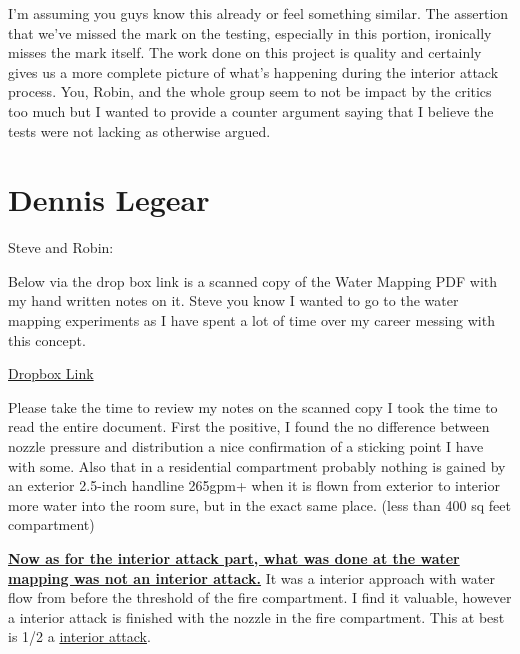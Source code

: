 \documentclass[12pt,oneside]{book}
\begin{document}
\begin{appendix}
I'm assuming you guys know this already or feel something similar.  The assertion that we've missed the mark on the testing, especially in this portion, ironically misses the mark itself.  The work done on this project is quality and certainly gives us a more complete picture of what's happening during the interior attack process.  You, Robin, and the whole group seem to not be impact by the critics too much but I wanted to provide a counter argument saying that I believe the tests were not lacking as otherwise argued.  

\section{Dennis Legear}

Steve and Robin:

Below via the drop box link is a scanned copy of the Water Mapping PDF with my hand written notes on it. Steve you know I wanted to go to the water mapping experiments as I have spent a lot of time over my career messing with this concept.

\hyperlink{https://www.dropbox.com/sh/1wmpqxr2a5fow0c/AAB1bfG-yKjGBKFCOlRtaYDya?dl=0}{Dropbox Link}

Please take the time to review my notes on the scanned copy I took the time to read the entire document.  First the positive, I found the no difference between nozzle pressure and distribution a nice confirmation of a sticking point I have with some.  Also that in a residential compartment probably nothing is gained by an exterior 2.5-inch handline 265gpm+ when it is flown from exterior to interior more water into the room sure, but in the exact same place. (less than 400 sq feet compartment)

\textbf{\ul{Now as for the interior attack part, what was done at the water mapping was not an interior attack.}}  It was a interior approach with water flow from before the threshold of the fire compartment.  I find it valuable, however a interior attack is finished with the nozzle in the fire compartment.  This at best is 1/2 a \ul{interior attack}. 


\end{appendix}
\end{document}
